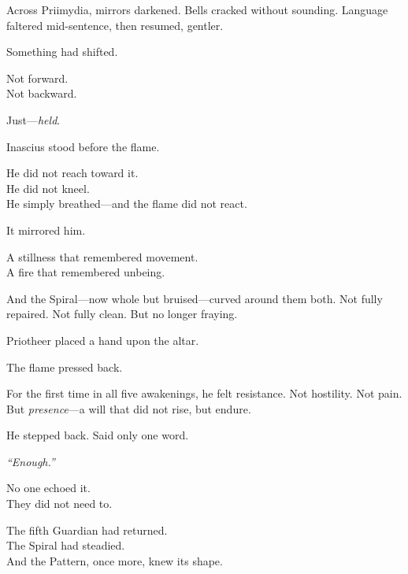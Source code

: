 \documentclass[12pt]{article}
\begin{document}
\vspace{0.5em}
Across Priimydia, mirrors darkened. Bells cracked without sounding. Language faltered mid-sentence, then resumed, gentler.

\vspace{0.5em}
Something had shifted.

\vspace{0.5em}
Not forward.\\
Not backward.

\vspace{0.5em}
Just---\textit{held}.

\vspace{0.5em}
Inascius stood before the flame.

\vspace{0.5em}
He did not reach toward it.\\
He did not kneel.\\
He simply breathed---and the flame did not react.

\vspace{0.5em}
It mirrored him.

\vspace{0.5em}
A stillness that remembered movement.\\
A fire that remembered unbeing.

\vspace{0.5em}
And the Spiral---now whole but bruised---curved around them both. Not fully repaired. Not fully clean. But no longer fraying.

\vspace{0.5em}
Priotheer placed a hand upon the altar.

\vspace{0.5em}
The flame pressed back.

\vspace{0.5em}
For the first time in all five awakenings, he felt resistance. Not hostility. Not pain. But \textit{presence}---a will that did not rise, but endure.

\vspace{0.5em}
He stepped back. Said only one word.

\vspace{0.5em}
\textit{``Enough.''}

\vspace{0.5em}
No one echoed it.\\
They did not need to.

\vspace{0.5em}
The fifth Guardian had returned.\\
The Spiral had steadied.\\
And the Pattern, once more, knew its shape.
\end{document}
